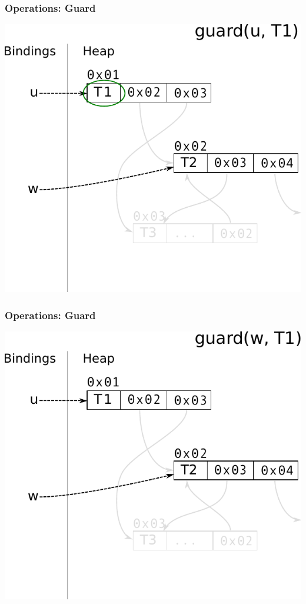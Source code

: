 \documentclass[utf8x]{beamer}
\begin{document}
\begin{frame}[plain]
  \frametitle{Operations: Guard}
  \includegraphics[scale=0.8]{figures/guard02}
\end{frame}

\begin{frame}[plain]
  \frametitle{Operations: Guard}
  \includegraphics[scale=0.8]{figures/guard03}
\end{frame}
\end{document}
